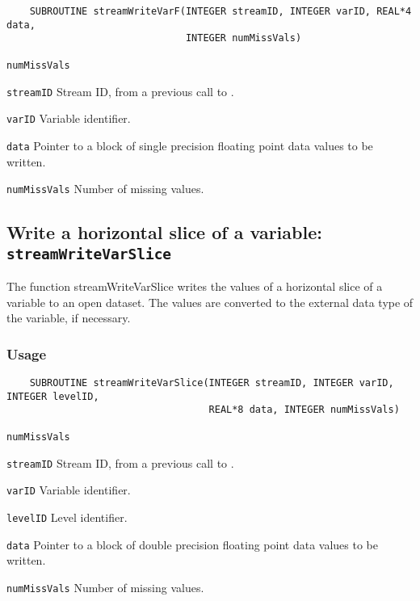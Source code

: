 \begin{verbatim}
    SUBROUTINE streamWriteVarF(INTEGER streamID, INTEGER varID, REAL*4 data, 
                               INTEGER numMissVals)
\end{verbatim}

\hspace*{4mm}\begin{minipage}[]{15cm}
\begin{deflist}{\texttt{numMissVals}\ }
\item[\texttt{streamID}]
Stream ID, from a previous call to {}.
\item[\texttt{varID}]
Variable identifier.
\item[\texttt{data}]
Pointer to a block of single precision floating point data values to be written.
\item[\texttt{numMissVals}]
Number of missing values.

\end{deflist}
\end{minipage}


\subsection{Write a horizontal slice of a variable: \texttt{streamWriteVarSlice}}
\label{streamWriteVarSlice}

The function streamWriteVarSlice writes the values of a horizontal slice of a variable to an open dataset.
The values are converted to the external data type of the variable, if necessary.
\subsubsection*{Usage}

\begin{verbatim}
    SUBROUTINE streamWriteVarSlice(INTEGER streamID, INTEGER varID, INTEGER levelID, 
                                   REAL*8 data, INTEGER numMissVals)
\end{verbatim}

\hspace*{4mm}\begin{minipage}[]{15cm}
\begin{deflist}{\texttt{numMissVals}\ }
\item[\texttt{streamID}]
Stream ID, from a previous call to {}.
\item[\texttt{varID}]
Variable identifier.
\item[\texttt{levelID}]
Level identifier.
\item[\texttt{data}]
Pointer to a block of double precision floating point data values to be written.
\item[\texttt{numMissVals}]
Number of missing values.

\end{deflist}
\end{minipage}


